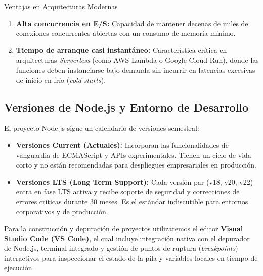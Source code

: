 \begin{definicion}{Ventajas en Arquitecturas Modernas}
\begin{enumerate}
    \item \textbf{Alta concurrencia en E/S:} Capacidad de mantener decenas de miles de conexiones concurrentes abiertas con un consumo de memoria mínimo.
    \item \textbf{Tiempo de arranque casi instantáneo:} Característica crítica en arquitecturas \emph{Serverless} (como AWS Lambda o Google Cloud Run), donde las funciones deben instanciarse bajo demanda sin incurrir en latencias excesivas de inicio en frío (\emph{cold starts}).
\end{enumerate}
\end{definicion}

\subsection{Versiones de Node.js y Entorno de Desarrollo}

El proyecto Node.js sigue un calendario de versiones semestral:
\begin{itemize}
    \item \textbf{Versiones Current (Actuales):} Incorporan las funcionalidades de vanguardia de ECMAScript y APIs experimentales. Tienen un ciclo de vida corto y no están recomendadas para despliegues empresariales en producción.
    \item \textbf{Versiones LTS (Long Term Support):} Cada versión par (v18, v20, v22) entra en fase LTS activa y recibe soporte de seguridad y correcciones de errores críticas durante 30 meses. Es el estándar indiscutible para entornos corporativos y de producción.
\end{itemize}

Para la construcción y depuración de proyectos utilizaremos el editor \textbf{Visual Studio Code (VS Code)}, el cual incluye integración nativa con el depurador de Node.js, terminal integrado y gestión de puntos de ruptura (\emph{breakpoints}) interactivos para inspeccionar el estado de la pila y variables locales en tiempo de ejecución.

